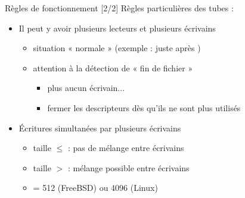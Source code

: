 \begin {frame} {Règles de fonctionnement [2/2]}
    Règles particulières des tubes :
    \begin {itemize}
	\item Il peut y avoir plusieurs lecteurs et plusieurs écrivains
	    \begin {itemize}
		\item situation « normale » (exemple : juste après )
		\item attention à la détection de « fin de fichier »
		    \begin {itemize}
			\item plus aucun écrivain...
			\item \implique fermer les descripteurs dès
			    qu'ils ne sont plus utilisés
		    \end {itemize}
	    \end {itemize}

	\item Écritures simultanées par plusieurs écrivains
	    \begin {itemize}
		\item taille $\leq$  : pas de mélange
		    entre écrivains
		\item taille $>$  : mélange possible
		    entre écrivains
		\item {} = 512 (FreeBSD) ou 4096 (Linux)
	    \end {itemize}

    \end {itemize}
\end {frame}



